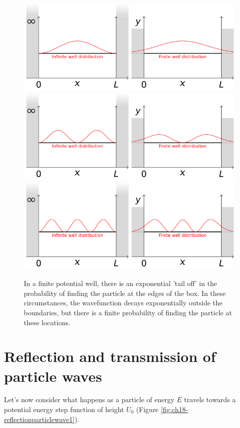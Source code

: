 \documentclass[
]{book}
\begin{document}
\begin{figure}

{\centering \includegraphics[width=0.7\linewidth]{visualisations/LaTeX/ch18-infinitefinite-well1} \includegraphics[width=0.7\linewidth]{visualisations/LaTeX/ch18-infinitefinite-well2} \includegraphics[width=0.7\linewidth]{visualisations/LaTeX/ch18-infinitefinite-well3} 

}

\caption{In a finite potential well, there is an exponential 'tail off' in the probability of finding the particle at the edges of the box. In these circumstances, the wavefunction decays exponentially outside the boundaries, but there is a finite probability of finding the particle at these locations.}\label{fig:ch18-finitewell1}
\end{figure}

\hypertarget{sec-ch18-reflectionparticlewaves}{%
\section{Reflection and transmission of particle waves}\label{sec-ch18-reflectionparticlewaves}}

Let's now consider what happens as a particle of energy \(E\) travels towards a potential energy step function of height \(U_0\) (Figure \ref{fig:ch18-reflectionparticlewave1}).
\end{document}
